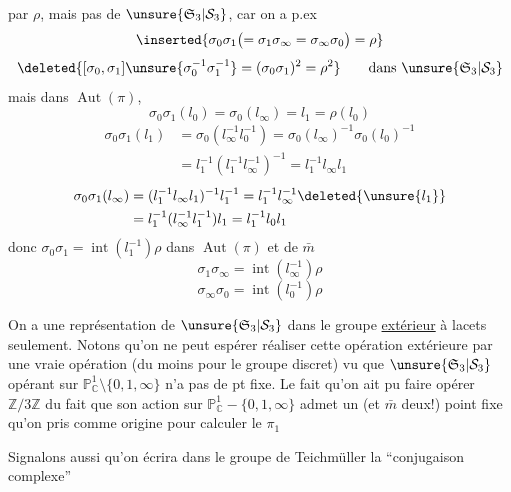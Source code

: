 par $\rho$, mais pas de $\unsure{\mathfrak S_3|\mathcal S_3}$, car on a p.ex
\[
\inserted{\sigma_0\sigma_1\bigl(=\sigma_1\sigma_\infty=\sigma_\infty\sigma_0\bigr)=\rho}
\]
\[
\deleted{[\sigma_0,\sigma_1]\unsure{\sigma_0^{-1}\sigma_1^{-1}}=(\sigma_0\sigma_1)^2=\rho^2}\qquad\text{dans }\unsure{\mathfrak S_3|\mathcal S_3}
\]
mais dans $\operatorname{Aut}(\pi)$, 
\[
\sigma_0\sigma_1(l_0)=\sigma_0(l_\infty)=l_1=\rho(l_0)
\]
\[
\begin{aligned}
\sigma_0\sigma_1(l_1)&=\sigma_0(l_\infty^{-1}l_0^{-1})=\sigma_0(l_\infty)^{-1}\sigma_0(l_0)^{-1}\\
&=l_1^{-1}(l_1^{-1}l_\infty^{-1})^{-1}=l_1^{-1}l_\infty l_1
\end{aligned}
\]
\[
\begin{aligned}
\sigma_0\sigma_1(l_\infty)&=(l_1^{-1}l_\infty l_1)^{-1}l_1^{-1}=l_1^{-1}l_\infty^{-1}\deleted{\unsure{l_1}}\\
&=l_1^{-1}(l_\infty^{-1}l_1^{-1})l_1=l_1^{-1}l_0l_1
\end{aligned}
\]
donc $\sigma_0\sigma_1=\operatorname{int}(l_1^{-1})\rho$ dans $\operatorname{Aut}(\pi)$
et de $\bar m$
\[
\sigma_1\sigma_\infty=\operatorname{int}(l_\infty^{-1})\rho
\]
\[
\sigma_\infty\sigma_0=\operatorname{int}(l_0^{-1})\rho
\]

On a une représentation de $\unsure{\mathfrak S_3|\mathcal S_3}$ dans le groupe \uline{extérieur} à lacets seulement. Notons qu'on ne peut espérer réaliser cette opération extérieure par une vraie opération (du moins pour le groupe discret) vu que $\unsure{\mathfrak S_3|\mathcal S_3}$ opérant sur $\mathbb P^1_{\mathbb C}\setminus\{0,1,\infty\}$ n'a pas de pt fixe. Le fait qu'on ait pu faire opérer $\mathbb Z/3\mathbb Z$   du fait que son action sur $\mathbb P^1_{\mathbb C}-\{0,1,\infty\}$ admet un (et $\bar m$ deux!) point fixe qu'on   pris comme origine pour calculer le $\pi_1$

Signalons aussi qu'on écrira dans le groupe de Teichmüller  la ``conjugaison complexe''
